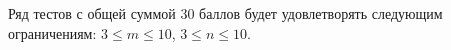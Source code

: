Ряд тестов с общей суммой 30 баллов будет удовлетворять следующим ограничениям: $3 \le m \le 10$, $3 \le n \le 10$.